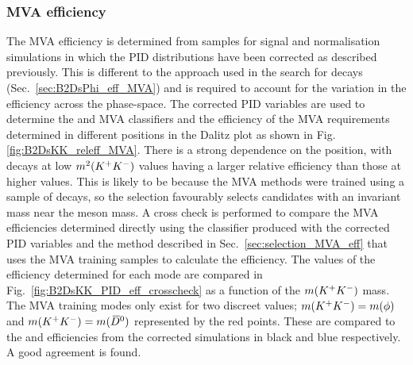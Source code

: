 \subsubsection{MVA efficiency}

The MVA efficiency is determined from samples for signal and normalisation simulations in which the PID distributions have been corrected as described previously. This is different to the approach used in the search for \decay{\Bp}{\Dsp\phiz} decays (Sec.~\ref{sec:B2DsPhi_eff_MVA}) and is required to account for the variation in the efficiency across the phase-space. The corrected PID variables are used to determine the \Dsp and \phiz MVA classifiers and the efficiency of the MVA requirements determined in different positions in the Dalitz plot as shown in Fig.\ref{fig:B2DsKK_releff_MVA}. There is a strong dependence on the position, with decays at low $m^{2}({{K}^+}{{K}^-})$ values having a larger relative efficiency than those at higher values. This is likely to be because the MVA methods were trained using a sample of \decay{\phiz}{\Kp\Km} decays, so the selection favourably selects candidates with an invariant mass near the \phiz meson mass. A cross check is performed to compare the MVA efficiencies determined directly using the classifier produced with the corrected PID variables and the method described in Sec.~\ref{sec:selection_MVA_eff} that uses the MVA training samples to calculate the efficiency. The values of the efficiency determined for each mode are compared in Fig.~\ref{fig:B2DsKK_PID_eff_crosscheck} as a function of the $m({{K}^+}{{K}^-})$ mass. The MVA training modes only exist for two discreet values; $m({{K}^+}{{K}^-})=m(\phi)$ and $m({{K}^+}{{K}^-})=m({{\kern 0.2em\overline{\kern -0.2em D}{}}{}^0})$ represented by the red points. These are compared to the \decay{\Bp}{\Dsp\Kp\Km} and \decay{\Bp}{\Ds\Dzb} efficiencies from the corrected simulations in black and blue respectively. A good agreement is found.

